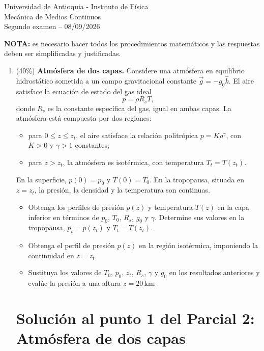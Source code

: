\documentclass[12pt]{article}
\begin{document}
\begin{center}
    Universidad de Antioquia - Instituto de Física\\
    Mecánica de Medios Continuos\\
    Segundo examen -- 08/09/2026
\end{center}

\textbf{NOTA:} es necesario hacer todos los procedimientos matemáticos y las respuestas deben ser simplificadas y justificadas.

\begin{enumerate}
    \item (40\%) \textbf{Atmósfera de dos capas.} Considere una atmósfera en equilibrio hidrostático sometida a un campo gravitacional constante $\vec{g} = -g_0 \hat{k}$. El aire satisface la ecuación de estado del gas ideal
    \[
    p = \rho R_s T,
    \]
    donde $R_s$ es la constante específica del gas, igual en ambas capas. La atmósfera está compuesta por dos regiones:
    \begin{itemize}
        \item para $0 \le z \le z_t$, el aire satisface la relación politrópica $p = K\rho^\gamma$, con $K > 0$ y $\gamma > 1$ constantes;
        \item para $z > z_t$, la atmósfera es isotérmica, con temperatura $T_t = T(z_t)$.
    \end{itemize}
    En la superficie, $p(0) = p_0$ y $T(0) = T_0$. En la tropopausa, situada en $z = z_t$, la presión, la densidad y la temperatura son continuas.
    \begin{itemize}
        \item[a)] Obtenga los perfiles de presión $p(z)$ y temperatura $T(z)$ en la capa inferior en términos de $p_0$, $T_0$, $R_s$, $g_0$ y $\gamma$. Determine sus valores en la tropopausa, $p_t = p(z_t)$ y $T_t = T(z_t)$.
        \item[b)] Obtenga el perfil de presión $p(z)$ en la región isotérmica, imponiendo la continuidad en $z = z_t$.
        \item[c)] Sustituya los valores de $T_0$, $p_0$, $z_t$, $R_s$, $\gamma$ y $g_0$ en los resultados anteriores y evalúe la presión a una altura $z = 20\,\mathrm{km}$.
    \end{itemize}

\section{Solución al punto 1 del Parcial 2: Atmósfera de dos capas}


\end{enumerate}
\end{document}
